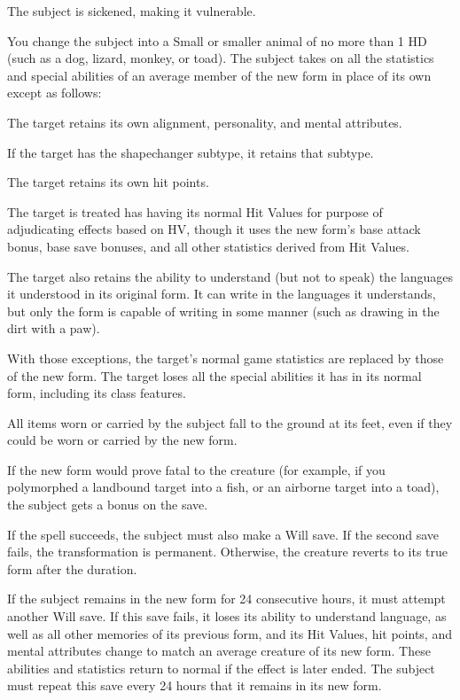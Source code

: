 \begin{spellhealthy}
  The subject is sickened, making it vulnerable.
\end{spellhealthy}
\begin{spellblood}
  You change the subject into a Small or smaller animal of no more than 1 HD (such as a dog, lizard, monkey, or toad). The subject takes on all the statistics and special abilities of an average member of the new form in place of its own except as follows:
  \begin{itemize*} 
    \item The target retains its own alignment, personality, and mental attributes.
    \item If the target has the shapechanger subtype, it retains that subtype. 
    \item The target retains its own hit points. 
    \item The target is treated has having its normal Hit Values for purpose of adjudicating effects based on HV, though it uses the new form's base attack bonus, base save bonuses, and all other statistics derived from Hit Values. 
    \item The target also retains the ability to understand (but not to speak) the languages it understood in its original form. It can write in the languages it understands, but only the form is capable of writing in some manner (such as drawing in the dirt with a paw). 
  \end{itemize*}
  With those exceptions, the target's normal game statistics are replaced by those of the new form. The target loses all the special abilities it has in its normal form, including its class features.

  All items worn or carried by the subject fall to the ground at its feet, even if they could be worn or carried by the new form. 

  If the new form would prove fatal to the creature (for example, if you polymorphed a landbound target into a fish, or an airborne target into a toad), the subject gets a  bonus on the save. 

  If the spell succeeds, the subject must also make a Will save. If the second save fails, the transformation is permanent. Otherwise, the creature reverts to its true form after the \durshort duration.

  If the subject remains in the new form for 24 consecutive hours, it must attempt another Will save. If this save fails, it loses its ability to understand language, as well as all other memories of its previous form, and its Hit Values, hit points, and mental attributes change to match an average creature of its new form. These abilities and statistics return to normal if the effect is later ended. The subject must repeat this save every 24 hours that it remains in its new form. 
\end{spellblood}
